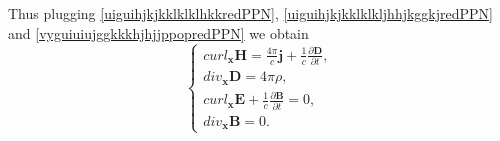 \documentclass{article}
\theoremstyle{definition}
\theoremstyle{remark}
\renewcommand{\vec}[1]{\mathbf{#1}}
\newcommand{\er}{\eqref}
\newcommand{\er}{\eqref}
\begin{document}
\begin{comment}
A^{-1}(t)\cdot A'(t)\cdot \vec B-\left(d_{\vec x} \vec B\right)\cdot
\left(A^{-1}(t)\cdot A'(t)\cdot\vec x+A^{-1}(t)\cdot\vec
w(t)\right),
\end{multline}
where $tr\left(A^{-1}(t)\cdot A'(t)\right)$ is a trace of the matrix
$A^{-1}(t)\cdot A'(t)$ (sum of diagonal elements). However, since
$A^T(t)\cdot A(t)=I$ we have $A^{-1}(t)=A^T(t)$ and $A^{-1}(t)\cdot
A'(t)=S(t)$, where $S^T(t)=-S(t)$. In particular $tr S(t)=0$ and
thus $tr\left(A^{-1}(t)\cdot A'(t)\right)=0$. Therefore, by
\er{MaxVacFull1ninshtrjhjgjhfjfj} and
\er{MaxVacFull1ninshtrjhjgjhfjfjyutjk} we obtain
\begin{multline}\label{MaxVacFull1ninshtrjhjgjhfjfjigyut}
curl_{\vec x}\left(\left(A^{-1}(t)\cdot A'(t)\cdot\vec
x+A^{-1}(t)\cdot\vec w(t)\right)\times \vec D\right) =\\
\left({div}_{\vec x} \vec D\right)\,\left(A^{-1}(t)\cdot
A'(t)\cdot\vec x+A^{-1}(t)\cdot\vec w(t)\right)+ A^{-1}(t)\cdot
A'(t)\cdot \vec D-\left(d_{\vec x} \vec D\right)\cdot
\left(A^{-1}(t)\cdot A'(t)\cdot\vec x+A^{-1}(t)\cdot\vec
w(t)\right),
\end{multline}
and
\begin{multline}\label{MaxVacFull1ninshtrjhjgjhfjfjyutjkfuygij}
curl_{\vec x}\left(\left(A^{-1}(t)\cdot A'(t)\cdot\vec
x+A^{-1}(t)\cdot\vec w(t)\right)\times \vec B\right) =\\
A^{-1}(t)\cdot A'(t)\cdot \vec B-\left(d_{\vec x} \vec B\right)\cdot
\left(A^{-1}(t)\cdot A'(t)\cdot\vec x+A^{-1}(t)\cdot\vec
w(t)\right),
\end{multline}
Thus plugging \er{MaxVacFull1ninshtrjhjgjhfjfjigyut} and
\er{MaxVacFull1ninshtrjhjgjhfjfjyutjkfuygij} into
\er{MaxVacFull1ninshtrjhjg} and \er{MaxVacFull1ninshtrjhjgghgkh} we
deduce
\end{comment}
%
%
%
%
Thus plugging \er{uiguihjkjkklklklhkkredPPN},
\er{uiguihjkjkklklkljhhjkggkjredPPN} and
\er{vyguiuiujggkkkhjhjjppopredPPN} we obtain
\begin{equation}\label{fhgjhkhkredPPN}
\begin{cases}
curl_{\vec x} \vec H= \frac{4\pi}{c}\vec
j+\frac{1}{c}\frac{\partial \vec D}{\partial t},\\
div_{\vec x} \vec D=4\pi\rho,
\\
curl_{\vec x} \vec E+\frac{1}{c}\frac{\partial \vec B}{\partial
t}=0,
\\
div_{\vec x} \vec B=0.
\end{cases}
\end{equation}
\end{document}
